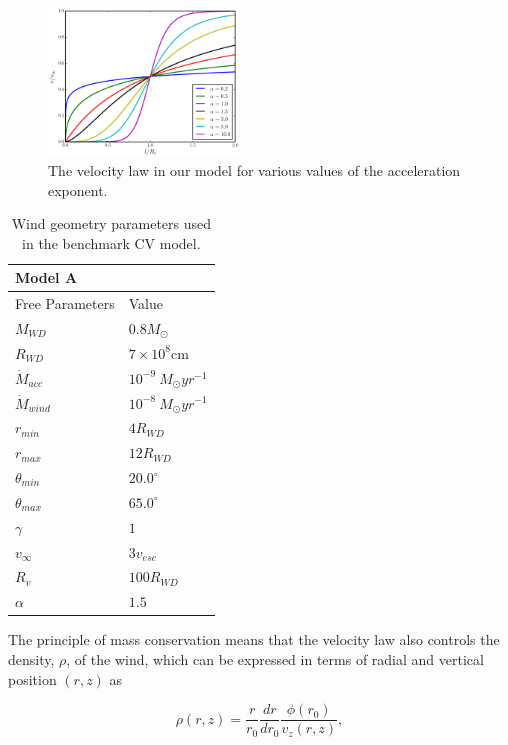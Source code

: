\documentclass[preprint, a4paper, 11pt]{aastex}
\begin{document}
\begin{figure}
\centering
\includegraphics[width=0.45\textwidth]{figures/acc_law.eps}
\caption{
The velocity law in our model for various values of
the acceleration exponent.
}
\label{acc_law}
\end{figure}


\begin{table}
\centering
\begin{tabular}{p{3cm}p{4cm}}
Model A \\
\hline Free Parameters 	&	 Value \\ 
\hline \hline 
$M_{WD}$ 	 &	 $0.8 M_{\odot}$ \\ 
$R_{WD}$ 	 &	 $7\times10^{8}$cm\\ 
$\dot{M}_{acc}$ 	 &	 $10^{-9}~M_{\odot}yr^{-1}$\\ 
$\dot{M}_{wind}$  &	$10^{-8}~M_{\odot}yr^{-1}$\\ 
$r_{min}$ 	&	 $4 R_{WD}$\\ 
$r_{max}$ 	&	 $12 R_{WD}$ \\ 
$\theta_{min}$ 	&	 $20.0^{\circ}$ \\ 
$\theta_{max}$ 	&	 $65.0^{\circ}$ \\ 
$\gamma$ 	&	 $1$ \\ 
$v_{\infty}$ 	&	 $3v_{esc}$ \\ 
$R_v$ 	        &	 $100 R_{WD}$ \\ 
$\alpha$ 	&	 $1.5$ \\
\end{tabular}
\centering
\caption{
Wind geometry parameters used in the benchmark CV model.}
\label{wind_param}
\end{table}


The principle of mass conservation means that the velocity law also 
controls the density, $\rho$, of the wind, which can be expressed in terms
of radial and vertical position $(r,z)$ as 

\begin{equation}
\rho(r,z) = \frac{r}{r_0} \frac{dr}{dr_0} \frac{\phi(r_0)}{v_z(r,z)},
\label{density}
\end{equation}
\end{document}
